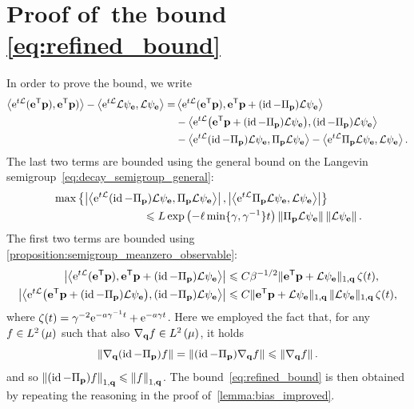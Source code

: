 \documentclass[11pt,a4paper]{article}
\begin{document}
\section{Proof of~\texorpdfstring{the bound \eqref{eq:refined_bound}}{the technical bound on the bias}}%
\label{sec:proof_technical_result}
In order to prove the bound,
we write
\begin{align*}
    \ip{\e^{t \mathcal L}(\vect e^\t \vect p)}{\vect e^\t \vect p)} - \ip{\e^{t \mathcal L} \mathcal L \psi_{\vect e}}{\mathcal L \psi_{\vect e}}
    = &\ip{\e^{t \mathcal L} (\vect e^\t \vect p)}{\vect e^\t \vect p + (\id - \Pi_{\vect p}) \mathcal L \psi_{\vect e}} \\
    & - \ip{\e^{t \mathcal L} \bigl(\vect e^\t \vect p + (\id - \Pi_{\vect p}) \mathcal L \psi_{\vect e}\bigr)}{(\id - \Pi_{\vect p}) \mathcal L \psi_{\vect e}} \\
    & - \ip{\e^{t \mathcal L} (\id - \Pi_{\vect p}) \mathcal L \psi_{\vect e}}{\Pi_{\vect p} \mathcal L \psi_{\vect e}}
    - \ip{\e^{t \mathcal L} \Pi_{\vect p} \mathcal L \psi_{\vect e}}{\mathcal L \psi_{\vect e}}.
\end{align*}
The last two terms are bounded using the general bound on the Langevin semigroup~\eqref{eq:decay_semigroup_general}:
\begin{align*}
    &\max \left\{
    \abs{\ip{\e^{t \mathcal L} (\id - \Pi_{\vect p}) \mathcal L \psi_{\vect e}}{\Pi_{\vect p} \mathcal L \psi_{\vect e}}},
    \abs{\ip{\e^{t \mathcal L} \Pi_{\vect p} \mathcal L \psi_{\vect e}}{\mathcal L \psi_{\vect e}}}
    \right\} \\
    &\qquad \qquad \qquad \qquad \leq L \exp \left( - \ell \min\{\gamma, \gamma^{-1}\} t\right) \norm{\Pi_{\vect p} \mathcal L \psi_{\vect e}} \norm{\mathcal L \psi_{\vect e}}.
\end{align*}
The first two terms are bounded using \cref{proposition:semigroup_meanzero_observable}:
\begin{align*}
    \abs{\ip{\e^{t \mathcal L} (\vect e^\t \vect p)}{\vect e^\t \vect p + (\id - \Pi_{\vect p}) \mathcal L \psi_{\vect e}}}
    &\leq C \beta^{-1/2} \norm*{\vect e^\t \vect p + \mathcal L \psi_{\vect e}}[1,\vect q] \, \zeta(t), \\
    \abs{\ip{\e^{t \mathcal L} \bigl(\vect e^\t \vect p + (\id - \Pi_{\vect p}) \mathcal L \psi_{\vect e}\bigr)}{(\id - \Pi_{\vect p}) \mathcal L \psi_{\vect e}}}
    &\leq C \norm*{\vect e^\t \vect p + \mathcal L \psi_{\vect e}}[1,\vect q] \, \norm*{\mathcal L \psi_{\vect e}}[1,\vect q] \, \zeta(t),
\end{align*}
where $\zeta(t) = \gamma^{-2} \mathrm{e}^{- a \gamma^{-1} t } + \mathrm{e}^{- a \gamma t}$.
Here we employed the fact that, for any $f \in \lp{2}{\mu}$ such that also $\grad_{\vect q} f \in \lp{2}{\mu}$,
it holds
\[
    \norm{\grad_{\vect q} (\id - \Pi_{\vect p}) f}
    = \norm{(\id - \Pi_{\vect p}) \grad_{\vect q} f}
    \leq \norm{\grad_{\vect q} f}.
\]
and so $\norm{(\id - \Pi_{\vect p}) f}[1,\vect q] \leq \norm{f}[1,\vect q]$.
The bound~\eqref{eq:refined_bound} is then obtained by repeating the reasoning in the proof of~\cref{lemma:bias_improved}.
\end{document}

